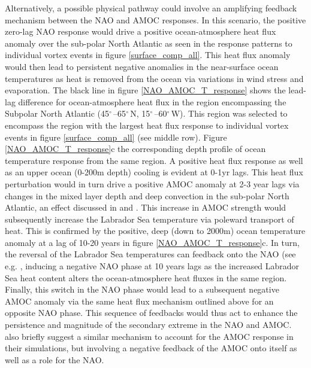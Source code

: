 Alternatively, a possible physical pathway could involve an amplifying feedback mechanism between the NAO and AMOC responses. In this scenario, the positive zero-lag NAO response would drive a positive ocean-atmosphere heat flux anomaly over the sub-polar North Atlantic as seen in the response patterns to individual vortex events in figure \ref{surface_comp_all}. This heat flux anomaly would then lead to persistent negative anomalies in the near-surface ocean temperatures as heat is removed from the ocean via variations in wind stress and evaporation. The black line in figure \ref{NAO_AMOC_T_response} shows the lead-lag difference for ocean-atmosphere heat flux in the region encompassing the Subpolar North Atlantic (45$^{\circ}$\,–65$^{\circ}$\,N, 15$^{\circ}$\,–60$^{\circ}$\,W). This region was selected to encompass the region with the largest heat flux response to individual vortex events in figure \ref{surface_comp_all} (see middle row). Figure \ref{NAO_AMOC_T_response}c the corresponding depth profile of ocean temperature response from the same region. A positive heat flux response as well as an upper ocean (0-200m depth) cooling is evident at 0-1yr lags. This heat flux perturbation would in turn drive a positive AMOC anomaly at 2-3 year lags via changes in the mixed layer depth and deep convection in the sub-polar North Atlantic, an effect discussed in \cite{delworthInterdecadal1993b} and \cite{medhaugMechanisms2012b}. This increase in AMOC strength would subsequently increase the Labrador Sea temperature via poleward transport of heat. This is confirmed by the positive, deep (down to 2000m) ocean temperature anomaly at a lag of 10-20 years in figure \ref{NAO_AMOC_T_response}c. In turn, the reversal of the Labrador Sea temperatures can feedback onto the NAO (see e.g. \cite{frankignoulInfluence2013b}, inducing a negative NAO phase at 10 years lags as the increased Labrador Sea heat content alters the ocean-atmosphere heat fluxes in the same region. Finally, this switch in the NAO phase would lead to a subsequent negative AMOC anomaly via the same heat flux mechanism outlined above for an opposite NAO phase. This sequence of feedbacks would thus act to enhance the persistence and magnitude of the secondary extreme in the NAO and AMOC. \cite{reichlerStratospheric2012b} also briefly suggest a similar mechanism to account for the AMOC response in their simulations, but involving a negative feedback of the AMOC onto itself as well as a role for the NAO. 


